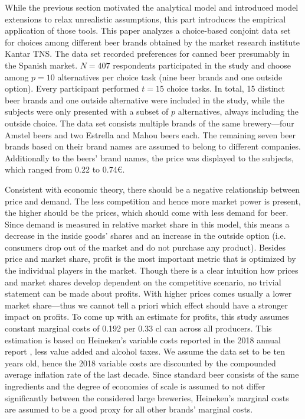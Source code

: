 \documentclass[12pt,a4paper]{article}
\begin{document}
While the previous section motivated the analytical model and introduced model extensions to relax unrealistic assumptions,
this part introduces the empirical application of those tools.
This paper analyzes a choice-based conjoint data set for choices among different beer brands obtained by the market research institute Kantar TNS.
The data set recorded preferences for canned beer presumably in the Spanish market.
 $N=407$ respondents participated in the study and choose among $p=10$ alternatives per choice task (nine beer brands and one outside option).
Every participant performed $t=15$ choice tasks. In total, 15 distinct beer brands and one outside alternative were included in the study,
while the subjects were only presented with a subset of $p$ alternatives, always including the outside choice.
The data set consists multiple brands of the same brewery---four Amstel beers and two Estrella and Mahou beers each.
The remaining seven beer brands based on their brand names are assumed to belong to different companies.
Additionally to the beers' brand names, the price was displayed to the subjects, which ranged from 0.22 to 0.74\euro.

Consistent with economic theory, there should be a negative relationship between price and demand.
The less competition and hence more market power is present, the higher should be the prices, which should come with less demand for beer.
Since demand is measured in relative market share in this model, this means a decrease in the inside goods' shares and an increase in the outside option (i.e. consumers drop out of the market and do not purchase any product).
Besides price and market share, profit is the most important metric that is optimized by the individual players in the market.
Though there is a clear intuition how prices and market shares develop dependent on the competitive scenario, no trivial statement can be made about profits.
With higher prices comes usually a lower market share---thus we cannot tell a priori which effect should have a stronger impact on profits.
To come up with an estimate for profits, this study assumes constant marginal costs of 0.192\text{ \euro } per 0.33 cl can across all producers.
This estimation is based on Heineken's variable costs reported in the 2018 annual report \citep{heinekenHeinekenAnnualReport2019}, less value added and alcohol taxes.
We assume the data set to be ten years old, hence the 2018 variable costs are discounted by the compounded average inflation rate of the last decade.
Since standard beer consists of the same ingredients and the degree of economies of scale is assumed to not differ significantly between the considered large breweries, Heineken's marginal costs are assumed to be a good proxy for all other brands' marginal costs.
\end{document}
